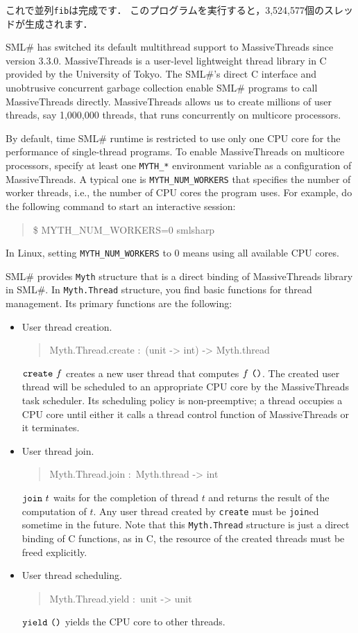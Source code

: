 \documentclass{jbook}
\newcommand{\smlsharp}{SML\#}
\newenvironment{program}{\begin{quote}\begin{tt}}%
                        {\end{tt}\end{quote}}
\begin{document}
	これで並列{\tt fib}は完成です．
	このプログラムを実行すると，3,524,577個のスレッドが生成されます．

\else%

	\smlsharp{} has switched its default multithread support to
MassiveThreads since version 3.3.0.
	MassiveThreads is a user-level lightweight thread library in C
provided by the University of Tokyo.
	The \smlsharp{}'s direct C interface and unobtrusive
concurrent garbage collection enable \smlsharp{} programs to call
MassiveThreads directly.
	MassiveThreads allows us to create millions of user threads,
say 1,000,000 threads, that runs concurrently on multicore processors.

	By default, time \smlsharp{} runtime is restricted to use
only one CPU core for the performance of single-thread programs.
	To enable MassiveThreads on multicore processors,
specify at least one \verb|MYTH_*| environment variable as a configuration
of MassiveThreads.
	A typical one is \verb|MYTH_NUM_WORKERS| that specifies the
number of worker threads, i.e., the number of CPU cores the program
uses.
	For example, do the following command to start an interactive
session:
\begin{program}
\$ MYTH\_NUM\_WORKERS=0 smlsharp
\end{program}
	In Linux, setting \verb|MYTH_NUM_WORKERS| to 0 means
using all available CPU cores.

	\smlsharp{} provides {\tt Myth} structure that is a direct
binding of MassiveThreads library in \smlsharp{}.
	In {\tt Myth.Thread} structure,
you find basic functions for thread management.
	Its primary functions are the following:
\begin{itemize}
\item
	User thread creation.
\begin{program}
Myth.Thread.create :\ (unit -> int) -> Myth.thread
\end{program}
	$\mbox{\tt create}\ f$
creates a new user thread that computes
$f\ \mbox{\tt ()}$.
	The created user thread will be scheduled to an appropriate
CPU core by the MassiveThreads task scheduler.
	Its scheduling policy is non-preemptive;
a thread occupies a CPU core until
either it calls a thread control function of MassiveThreads
or it terminates.
\item
	User thread join.
\begin{program}
Myth.Thread.join :\ Myth.thread -> int
\end{program}
	$\mbox{\tt join}\ t$
waits for the completion of thread $t$ and returns the result of the
computation of $t$.
	Any user thread created by {\tt create} must be
{\tt join}ed sometime in the future.
	Note that this {\tt Myth.Thread} structure is just a direct
binding of C functions, as in C, the resource of the created threads
must be freed explicitly.
\item
	User thread scheduling.
\begin{program}
Myth.Thread.yield :\ unit -> unit
\end{program}
	$\mbox{\tt yield}\ \mbox{\tt ()}$
yields the CPU core to other threads.
\end{itemize}
\end{document}

